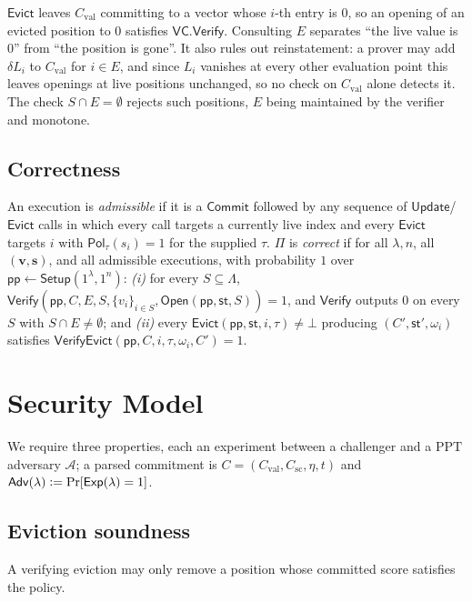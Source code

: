 \documentclass[version=preprint]{iacrcc}
\theoremstyle{definition}
\newcommand{\secpar}{\lambda}
\newcommand{\PPT}{\mathrm{PPT}}
\newcommand{\defeq}{\vcentcolon=}
\newcommand{\Setup}{\mathsf{Setup}}
\newcommand{\Commit}{\mathsf{Commit}}
\newcommand{\Open}{\mathsf{Open}}
\newcommand{\Vfy}{\mathsf{Verify}}
\newcommand{\Update}{\mathsf{Update}}
\newcommand{\Evict}{\mathsf{Evict}}
\newcommand{\VfyEvict}{\mathsf{VerifyEvict}}
\newcommand{\pp}{\mathsf{pp}}
\newcommand{\aux}{\mathsf{st}}
\newcommand{\Pol}{\mathsf{Pol}}
\newcommand{\Adv}{\mathsf{Adv}}
\newcommand{\Exp}{\mathsf{Exp}}
\newcommand{\Val}{\mathrm{val}}
\newcommand{\Sc}{\mathrm{sc}}
\newcommand{\Cval}{C_{\Val}}
\newcommand{\Csc}{C_{\Sc}}
\newcommand{\Live}{\Lambda}
\newcommand{\Evicted}{E}
\newcommand{\A}{\mathcal{A}}
\newcommand{\VC}{\mathsf{VC}}
\begin{document}
\begin{remark}[Why $\Vfy$ consults $\Evicted$]\label{rem:live}
$\Evict$ leaves $\Cval$ committing to a vector whose $i$-th entry is $0$, so an
opening of an evicted position to $0$ satisfies $\VC.\Vfy$. Consulting $\Evicted$
separates ``the live value is $0$'' from ``the position is gone''. It also rules
out reinstatement: a prover may add $\delta L_i$ to $\Cval$ for $i\in\Evicted$,
and since $L_i$ vanishes at every other evaluation point this leaves openings at
live positions unchanged, so no check on $\Cval$ alone detects it. The check
$S\cap\Evicted=\emptyset$ rejects such positions, $\Evicted$ being maintained by
the verifier and monotone.
\end{remark}

\subsection{Correctness}

\begin{definition}[Correctness]\label{def:correct}
An execution is \emph{admissible} if it is a $\Commit$ followed by any sequence
of $\Update$/$\Evict$ calls in which every call targets a currently live index
and every $\Evict$ targets $i$ with $\Pol_\tau(s_i)=1$ for the supplied $\tau$.
$\Pi$ is \emph{correct} if for all $\secpar,n$, all
$(\mathbf{v},\mathbf{s})$, and all admissible executions, with probability $1$
over $\pp\leftarrow\Setup(1^\secpar,1^n)$: \emph{(i)} for every $S\subseteq\Live$,
$\Vfy(\pp,C,\Evicted,S,\{v_i\}_{i\in S},\Open(\pp,\aux,S))=1$, and $\Vfy$
outputs $0$ on every $S$ with $S\cap\Evicted\neq\emptyset$; and \emph{(ii)} every
$\Evict(\pp,\aux,i,\tau)\neq\bot$ producing $(C',\aux',\omega_i)$ satisfies
$\VfyEvict(\pp,C,i,\tau,\omega_i,C')=1$.
\end{definition}

\section{Security Model}\label{sec:secmodel}

We require three properties, each an experiment between a challenger and a
$\PPT$ adversary $\A$; a parsed commitment is $C=(\Cval,\Csc,\eta,t)$ and
$\Adv(\secpar)\defeq\Pr[\Exp(\secpar)=1]$.

\subsection{Eviction soundness}
A verifying eviction may only remove a position whose committed score satisfies
the policy.
\end{document}
